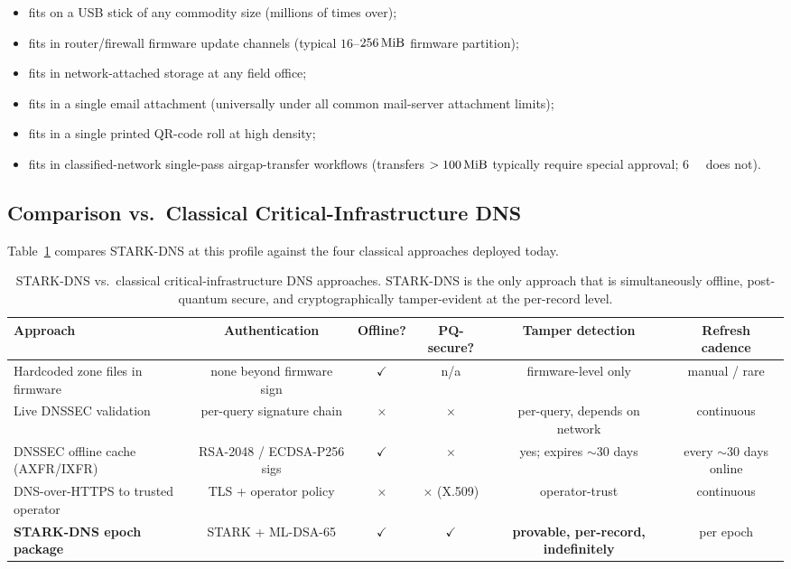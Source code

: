 \begin{itemize}
  \item fits on a USB stick of any commodity size (millions of times over);
  \item fits in router/firewall firmware update channels (typical
        $16$--$\SI{256}{\mebi\byte}$ firmware partition);
  \item fits in network-attached storage at any field office;
  \item fits in a single email attachment (universally under all common
        mail-server attachment limits);
  \item fits in a single printed QR-code roll at high density;
  \item fits in classified-network single-pass airgap-transfer workflows
        (transfers $> \SI{100}{\mebi\byte}$ typically require special
        approval; \SI{6}{\mebi\byte} does not).
\end{itemize}

\subsection{Comparison vs.\ Classical Critical-Infrastructure DNS}
\label{ssec:critinfra-compare}

Table~\ref{tab:critinfra-compare} compares STARK-DNS at this profile
against the four classical approaches deployed today.

\begin{table}[t]
\centering
\caption{STARK-DNS vs.\ classical critical-infrastructure DNS
approaches.  STARK-DNS is the only approach that is simultaneously
offline, post-quantum secure, and cryptographically tamper-evident
at the per-record level.}
\label{tab:critinfra-compare}
\begin{tabular}{lccccc}
\toprule
Approach & Authentication & Offline? & PQ-secure? & Tamper detection & Refresh cadence \\
\midrule
Hardcoded zone files in firmware    & none beyond firmware sign & $\checkmark$ & n/a          & firmware-level only & manual / rare \\
Live DNSSEC validation              & per-query signature chain & $\times$     & $\times$     & per-query, depends on network & continuous \\
DNSSEC offline cache (AXFR/IXFR)    & RSA-2048 / ECDSA-P256 sigs & $\checkmark$ & $\times$     & yes; expires $\sim$30 days & every $\sim$30 days online \\
DNS-over-HTTPS to trusted operator  & TLS + operator policy     & $\times$     & $\times$ (X.509) & operator-trust & continuous \\
\textbf{STARK-DNS epoch package}    & STARK + ML-DSA-65         & $\checkmark$ & \textbf{$\checkmark$} & \textbf{provable, per-record, indefinitely} & per epoch \\
\bottomrule
\end{tabular}
\end{table}

